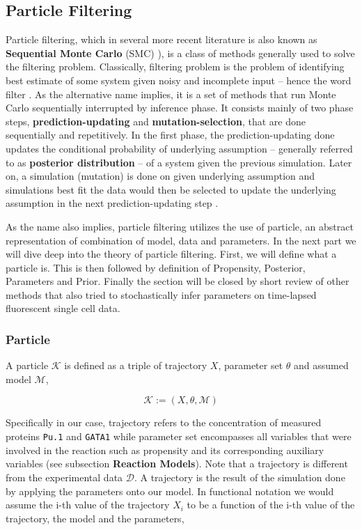 \documentclass{bioinfo}
\begin{document}
\subsection{Particle Filtering}

Particle filtering, which in several more recent literature is also known as \textbf{Sequential Monte Carlo} (SMC) \citep{Doucet01, Liu98}), is a class of methods generally used to solve the filtering problem. Classically, filtering problem is the problem of identifying best estimate of some system given noisy and incomplete input -- hence the word filter \citep{DelMoral96}. As the alternative name implies, it is a set of methods that run Monte Carlo sequentially interrupted by inference phase. It consists mainly of two phase steps, \textbf{prediction-updating} and \textbf{mutation-selection}, that are done sequentially and repetitively. In the first phase, the prediction-updating done updates the conditional probability of underlying assumption -- generally referred to as \textbf{posterior distribution} -- of a system given the previous simulation. Later on, a simulation (mutation) is done on given underlying assumption and simulations best fit the data would then be selected to update the underlying assumption in the next prediction-updating step \citep{DelMoral12}.

As the name also implies, particle filtering utilizes the use of particle, an abstract representation of combination of model, data and parameters. In the next part we will dive deep into the theory of particle filtering. First, we will define what a particle is. This is then followed by definition of Propensity, Posterior, Parameters and Prior. Finally the section will be closed by short review of other methods that also tried to stochastically infer parameters on time-lapsed fluorescent single cell data.

\subsubsection{Particle}

A particle $\mathcal{K}$ is defined as a triple of trajectory $X$, parameter set $\theta$ and assumed model $\mathcal{M}$,

\begin{equation}
\mathcal{K} := (X, \theta, \mathcal{M})\label{eq:01}
\end{equation}

Specifically in our case, trajectory refers to the concentration of measured proteins \texttt{Pu.1} and \texttt{GATA1} while parameter set encompasses all variables that were involved in the reaction such as propensity and its corresponding auxiliary variables (see subsection \textbf{Reaction Models}). Note that a trajectory is different from the experimental data $\mathcal{D}$. A trajectory is the result of the simulation done by applying the parameters onto our model. In functional notation we would assume the i-th value of the trajectory $X_i$ to be a function of the i-th value of the trajectory, the model and the parameters,
\end{document}
